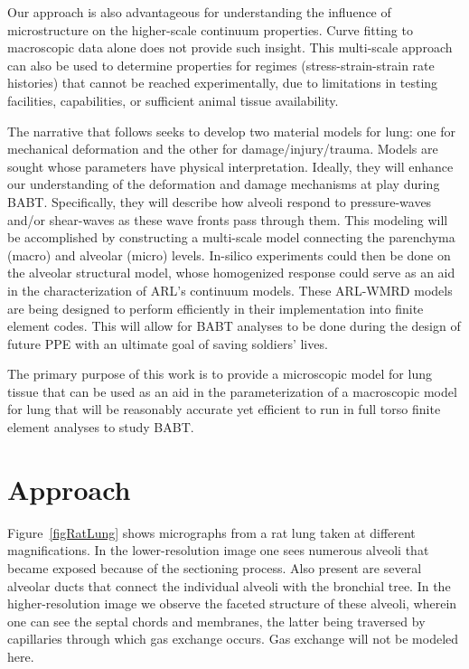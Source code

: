 Our approach is also advantageous for understanding the influence of microstructure on the higher-scale continuum properties.  Curve fitting to macroscopic data alone does not provide such insight.  This multi-scale approach can also be used to determine properties for regimes (stress-strain-strain rate histories) that cannot be reached experimentally, due to limitations in testing facilities, capabilities, or sufficient animal tissue availability. 

The narrative that follows seeks to develop two material models for lung: one for mechanical deformation and the other for damage\slash injury\slash trauma.  Models are sought whose parameters have physical interpretation.  Ideally, they will enhance our understanding of the deformation and damage mechanisms at play during BABT.  Specifically, they will describe how alveoli respond to pressure-waves and\slash or shear-waves as these wave fronts pass through them.  This modeling will be accomplished by constructing a multi-scale model connecting the parenchyma (macro) and alveolar (micro) levels.  In-silico experiments could then be done on the alveolar structural model, whose homogenized response could serve as an aid in the characterization of ARL's continuum models.  These ARL-WMRD models are being designed to perform efficiently in their implementation into finite element codes.  This will allow for BABT analyses to be done during the design of future PPE with an ultimate goal of saving soldiers' lives.

The primary purpose of this work is to provide a micro\-scopic model for lung tissue that can be used as an aid in the parameterization of a macro\-scopic model for lung that will be reasonably accurate yet efficient to run in full torso finite element analyses to study BABT.

\section{Approach}

Figure~\ref{figRatLung} shows micrographs from a rat lung taken at different magnifications. In the lower-resolution image one sees numerous alveoli that became exposed because of the sectioning process.  Also present are several alveolar ducts that connect the individual alveoli with the bronchial tree.  In the higher-resolution image we observe the faceted structure of these alveoli, wherein one can see the septal chords and membranes, the latter being traversed by capillaries through which gas exchange occurs.  Gas exchange will not be modeled here.

